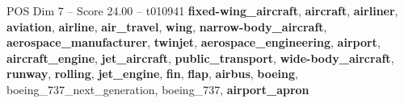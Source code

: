 \begin{textsample}{POS Dim 7 – Score 24.00 – t010941}  \label{ex:f7_pos_008}
\textbf{fixed-wing\_aircraft}, \textbf{aircraft}, \textbf{airliner}, \textbf{aviation}, \textbf{airline}, \textbf{air\_travel}, \textbf{wing}, \textbf{narrow-body\_aircraft}, \textbf{aerospace\_manufacturer}, \textbf{twinjet}, \textbf{aerospace\_engineering}, \textbf{airport}, \textbf{aircraft\_engine}, \textbf{jet\_aircraft}, \textbf{public\_transport}, \textbf{wide-body\_aircraft}, \textbf{runway}, \textbf{rolling}, \textbf{jet\_engine}, \textbf{fin}, \textbf{flap}, \textbf{airbus}, \textbf{boeing}, boeing\_737\_next\_generation, boeing\_737, \textbf{airport\_apron}

\end{textsample}
